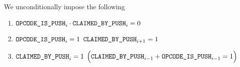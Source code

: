 We unconditionally impose the following
\begin{enumerate}
    \item $\texttt{OPCODE\_IS\_PUSH}_{i} \cdot \texttt{CLAIMED\_BY\_PUSH}_{i} = 0$
    \item \If $\texttt{OPCODE\_IS\_PUSH}_{i} = 1$ \Then $\texttt{CLAIMED\_BY\_PUSH}_{i + 1} = 1$
    \item \If $\texttt{CLAIMED\_BY\_PUSH}_{i} = 1$ \Then $\Big(\texttt{CLAIMED\_BY\_PUSH}_{i - 1} + \texttt{OPCODE\_IS\_PUSH}_{i - 1} = 1\Big)$
\end{enumerate}
